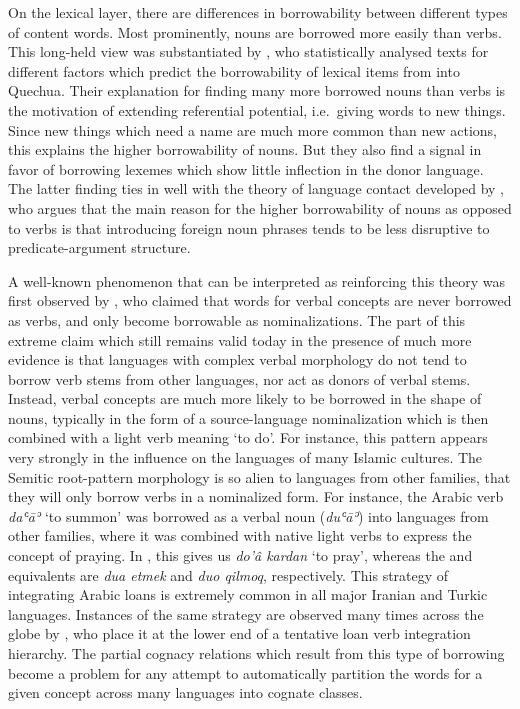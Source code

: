 On the lexical layer, there are differences in borrowability between different types of content words. Most prominently, nouns are borrowed more easily than verbs. This long-held view was substantiated by \citet{van-hout_muysken_1994}, who statistically analysed texts for different factors which predict the borrowability of lexical items from  into Quechua. Their explanation for finding many more borrowed nouns than verbs is the motivation of extending referential potential, i.e.\ giving words to new things. Since new things which need a name are much more common than new actions, this explains the higher borrowability of nouns. But they also find a signal in favor of borrowing lexemes which show little inflection in the donor language. The latter finding ties in well with the theory of language contact developed by \citet[Ch. 6]{myers-scotton2002}, who argues that the main reason for the higher borrowability of nouns as opposed to verbs is that introducing foreign noun phrases tends to be less 
disruptive to predicate-argument structure.

A well-known phenomenon that can be interpreted as reinforcing this theory was first observed by \citet{moravcsik1975}, who claimed that words for verbal concepts are never borrowed as verbs, and only become borrowable as nominalizations. The part of this extreme claim which still remains valid today in the presence of much more evidence is that languages with complex verbal morphology do not tend to borrow verb stems from other languages, nor act as donors of verbal stems. Instead, verbal concepts are much more likely to be borrowed in the shape of nouns, typically in the form of a source-language nominalization which is then combined with a light verb meaning `to do'. For instance, this pattern appears very strongly in the  influence on the languages of many Islamic cultures. The Semitic root-pattern morphology is so alien to languages from other families, that they will only borrow verbs in a nominalized form. For instance, the Arabic verb \textit{daʿ\={a}ʾ} `to summon' was borrowed as a 
verbal noun (\textit{duʿ\={a}ʾ}) into languages from other families, where it was combined with native light verbs to express the concept of praying. In , this gives us \textit{do'\^{a} kardan} `to pray', whereas the  and  equivalents are \textit{dua etmek} and \textit{duo qilmoq}, respectively. This strategy of integrating Arabic loans is extremely common in all major Iranian and Turkic languages. Instances of the same strategy are observed many times across the globe by \citet{wichmann_wohlgemuth_2008}, who place it at the lower end of a tentative loan verb integration hierarchy. The partial cognacy relations which result from this type of borrowing become a problem for any attempt to automatically partition the words for a given concept across many languages into cognate classes.

